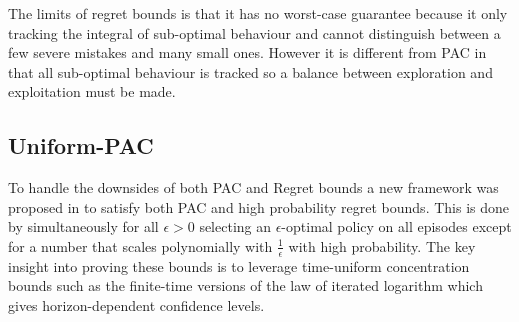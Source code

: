 \documentclass{article}[12pt]
\begin{document}
The limits of regret bounds is that it has no worst-case guarantee because it only tracking the integral of sub-optimal behaviour and cannot distinguish between a few severe mistakes and many small ones. However it is different from PAC in that all sub-optimal behaviour is tracked so a balance between exploration and exploitation must be made.

\subsection{Uniform-PAC}
To handle the downsides of both PAC and Regret bounds a new framework was proposed in \cite{DannLattimoreBrunskill17} to satisfy both PAC and high probability regret bounds. This is done by simultaneously for all $\epsilon > 0$ selecting an $\epsilon$-optimal policy on all episodes except for a number that scales polynomially with $\frac{1}{\epsilon}$ with high probability. The key insight into proving these bounds is to leverage time-uniform concentration bounds such as the finite-time versions of the law of iterated logarithm which gives horizon-dependent confidence levels.
%




 
\end{document}
